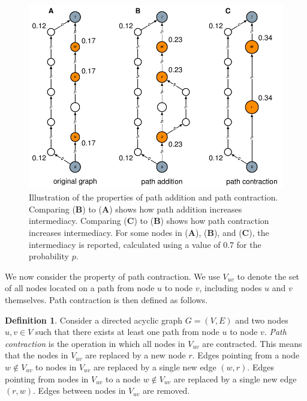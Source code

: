 \documentclass[9pt,twocolumn,twoside,lineno]{pnas-alt}
\theoremstyle{definition}
\newtheorem{definition}{Definition}
\begin{document}
\begin{sansmath}\begin{figure}[t]
  \centering%
  \includegraphics[width=\linewidth]{properties}
  \caption{Illustration of the properties of path addition and path contraction. Comparing (\textbf{B}) to (\textbf{A}) shows how path addition increases intermediacy. Comparing (\textbf{C}) to (\textbf{B}) shows how path contraction increases intermediacy. For some nodes in (\textbf{A}), (\textbf{B}), and (\textbf{C}), the intermediacy is reported, calculated using a value of $0.7$ for the probability $p$.}
  \label{fig:properties}
\end{figure}\end{sansmath}

We now consider the property of path contraction. We use $V_{uv}$ to denote the set of all nodes located on a path from node $u$ to node $v$, including nodes $u$ and $v$ themselves. Path contraction is then defined as follows.

\begin{definition}
    Consider a directed acyclic graph $G = (V, E)$ and two nodes $u, v \in V$ such that there exists at least one path from node $u$ to node $v$. \emph{Path contraction} is the operation in which all nodes in $V_{uv}$ are contracted. This means that the nodes in $V_{uv}$ are replaced by a new node $r$. Edges pointing from a node $w \notin V_{uv}$ to nodes in $V_{uv}$ are replaced by a single new edge $(w, r)$. Edges pointing from nodes in $V_{uv}$ to a node $w \notin V_{uv}$ are replaced by a single new edge $(r, w)$. Edges between nodes in $V_{uv}$ are removed.
\end{definition}
\end{document}
